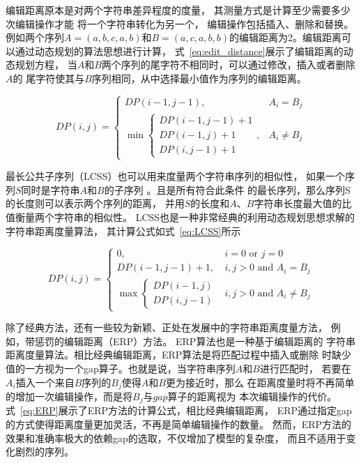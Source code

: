 编辑距离原本是对两个字符串差异程度的度量，
其测量方式是计算至少需要多少次编辑操作才能
将一个字符串转化为另一个，
编辑操作包括插入、删除和替换\cite{DBLP:journals/prl/Gorecki14}。
例如两个序列$A=\left(a,b,c,a,b\right)$和$B=\left(a,c,a,b,b\right)$的编辑距离为2。编辑距离可以通过动态规划的算法思想进行计算，
式~\ref{eq:edit_distance}展示了编辑距离的动态规划方程，
当$A$和$B$两个序列的尾字符不相同时，可以通过修改，插入或者删除$A$的
尾字符使其与$B$序列相同，从中选择最小值作为序列的编辑距离。


\begin{equation}
  DP(i, j)= \begin{cases}DP(i-1, j-1), & A_{i}=B_{j} \\
    \min \left\{\begin{array}{c}
    D P(i-1, j-1)+1 \\
    D P(i-1, j)+1 \\
    D P(i, j-1)+1
    \end{array}\right. , & A_{i} \neq B_{j}
  \end{cases}
  \label{eq:edit_distance}
\end{equation}

最长公共子序列（LCSS）也可以用来度量两个字符串序列的相似性，
如果一个序列$S$同时是字符串$A$和$B$的子序列
\cite{DBLP:conf/spire/BergrothHR00}。且是所有符合此条件
的最长序列，那么序列S的长度则可以表示两个序列的距离，
并用$S$的长度和$A$、$B$字符串长度最大值的比值衡量两个字符串的相似性。
LCSS也是一种非常经典的利用动态规划思想求解的字符串距离度量算法，
其计算公式如式~\ref{eq:LCSS}所示

\begin{equation}
  D P(i, j)= \begin{cases}0, & i=0 \text { or } j=0 \\ D P(i-1, j-1)+1, & i, j>0 \text { and } A_{i}=B_{j} \\ \max \begin{cases}D P(i-1, j) \\ D P(i, j-1)\end{cases} & i, j>0 \text { and } A_{i} \neq B_{j}\end{cases}
  \label{eq:LCSS}
\end{equation}

除了经典方法，还有一些较为新颖、正处在发展中的字符串距离度量方法，
例如，带惩罚的编辑距离（ERP）方法\cite{DBLP:conf/vldb/ChenN04}。
ERP算法也是一种基于编辑距离的
字符串距离度量算法。相比经典编辑距离，ERP算法是将匹配过程中插入或删除
时缺少值的一方视为一个gap算子。也就是说，当字符串序列$A$和$B$进行匹配时，
若要在$A_i$插入一个来自$B$序列的$B_j$使得$A$和$B$更为接近时，那么
在距离度量时将不再简单的增加一次编辑操作，而是将$B_j$与$gap$算子的距离视为
本次编辑操作的代价。式~\ref{eq:ERP}展示了ERP方法的计算公式，相比经典编辑距离，
ERP通过指定gap的方式使得距离度量更加灵活，不再是简单编辑操作的数量。
然而，ERP方法的效果和准确率极大的依赖gap的选取，不仅增加了模型的复杂度，
而且不适用于变化剧烈的序列。

